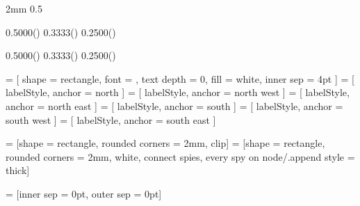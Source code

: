 
\usepackage{calc}
\usepackage{tikz}
\usetikzlibrary{calc,positioning,spy,shapes}



\newlength{\pfull}  \setlength{\pfull}  {2mm}
\newlength{\phalf}  \setlength{\phalf}  {0.5\pfull}

\newlength{\lwffp}   \setlength{\lwffp}   {0.5000\dimexpr(\pfull)}
\newlength{\lwfffp}  \setlength{\lwfffp}  {0.3333\dimexpr(\pfull)}
\newlength{\lwffffp} \setlength{\lwffffp} {0.2500\dimexpr(\pfull)}
\newlength{\lwfffffp}\setlength{\lwfffffp}{0.2000\dimexpr(\linewidth-4.0\pfull)}

\newlength{\twffp}   \setlength{\twffp}   {0.5000\dimexpr(\pfull)}
\newlength{\twfffp}  \setlength{\twfffp}  {0.3333\dimexpr(\pfull)}
\newlength{\twffffp} \setlength{\twffffp} {0.2500\dimexpr(\pfull)}
\newlength{\twfffffp}\setlength{\twfffffp}{0.2000\dimexpr(\textwidth-4.0\pfull)}

 = [ shape = rectangle, font = \scriptsize, text depth = 0, fill = white, inner sep = 4pt ]
  = [ labelStyle, anchor = north ]
 = [ labelStyle, anchor = north west ]
 = [ labelStyle, anchor = north east ]
  = [ labelStyle, anchor = south ]
 = [ labelStyle, anchor = south west ]
 = [ labelStyle, anchor = south east ]

 = [shape = rectangle, rounded corners = 2mm, clip] %
 = [shape = rectangle, rounded corners = 2mm, %
    white, connect spies, every spy on node/.append style = {thick}] %

 = [inner sep = 0pt, outer sep = 0pt] %
